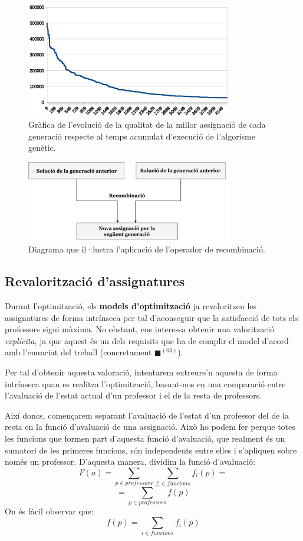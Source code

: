 \documentclass[10pt,twocolumn]{article}
\begin{document}
\begin{figure}[!]
	\centering
	\includegraphics[width=9cm]{progress_ga}
	\caption{ \small Gràfica de l'evolució de la qualitat de la millor assignació de cada generació respecte al temps acumulat d'execució de l'algorisme genètic. }
	\label{fio}
\end{figure}
\begin{figure}[ht]
	\centering
	\includegraphics[width=9cm]{recombinacio}
	\caption{ \small Diagrama que il·lustra l'aplicació de l'operador de recombinació. }
	\label{firo}
\end{figure}
\subsection{Revalorització d'assignatures}
Durant l'optimització, els \textbf{models d'optimització} ja revaloritzen les assignatures de forma intrínseca per tal d'aconseguir que la satisfacció de tots els professors sigui màxima. No obstant, ens interessa obtenir una valorització \textit{explícita}, ja que aquest és un dels requisits que ha de complir el model d'acord amb l'enunciat del treball (concretament {\color{green!60}$\blacksquare$}$^{(03)}$).

Per tal d'obtenir aquesta valoració, intentarem extreure'n aquesta de forma intrínseca quan es realitza l'optimització, basant-nos en una comparació entre l'avaluació de l'estat actual d'un professor i el de la resta de professors.

Així doncs, començarem separant l'avaluació de l'estat d'un professor del de la resta en la funció d'avaluació de una assignació. Això ho podem fer perque totes les funcions que formen part d'aquesta funció d'avaluació, que realment és un sumatori de les primeres funcions, són independents entre elles i s'apliquen sobre només un professor. D'aquesta manera, dividim la funció d'avaluació:
$$F(a)= \displaystyle \sum_{p\in professors} \sum_{f_i\in funcions} f_i(p) = $$
$$= \displaystyle \sum_{p\in professors} f(p)$$
On és fàcil observar que:
$$f(p)=\sum_{i\in funcions} f_i(p)$$
\end{document}
